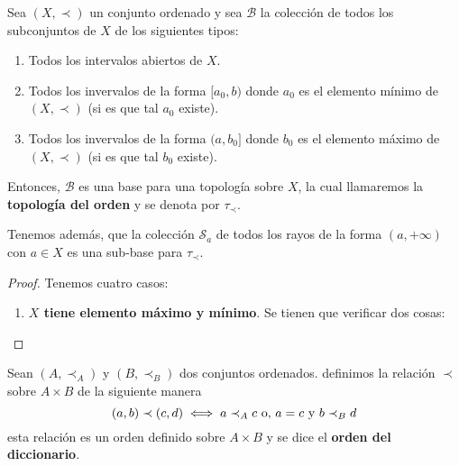 \documentclass[12pt]{report}
\theoremstyle{largebreak}
\begin{document}
    \begin{propo}
        Sea $(X,\prec)$ un conjunto ordenado y sea $\mathcal{B}$ la colección de todos los subconjuntos de $X$ de los siguientes tipos:
        \begin{enumerate}
            \item Todos los intervalos abiertos de $X$.
            \item Todos los invervalos de la forma $[a_0,b)$ donde $a_0$ es el elemento mínimo de $(X,\prec)$ (si es que tal $a_0$ existe).
            \item Todos los invervalos de la forma $(a,b_0]$ donde $b_0$ es el elemento máximo de $(X,\prec)$ (si es que tal $b_0$ existe).
        \end{enumerate}
        Entonces, $\mathcal{B}$ es una base para una topología sobre $X$, la cual llamaremos la \textbf{topología del orden} y se denota por $\tau_\prec$.

        Tenemos además, que la colección $\mathcal{S}_a$ de todos los rayos de la forma $(a,+\infty)$ con $a\in X$ es una sub-base para $\tau_\prec$.
    \end{propo}
    
    \begin{proof}
        Tenemos cuatro casos:
        \begin{enumerate}
            \item \textbf{$X$ tiene elemento máximo y mínimo}. Se tienen que verificar dos cosas:
        \end{enumerate}
    \end{proof}

    \begin{mydef}
        Sean $(A,\prec_A)$ y $(B,\prec_B)$ dos conjuntos ordenados. definimos la relación $\prec$ sobre $A\times B$ de la siguiente manera
        \begin{equation*}
            (a,b)\prec(c,d)\iff a\prec_A c\textup{ o, }a = c \textup{ y }b\prec_B d
        \end{equation*}
        esta relación es un orden definido sobre $A\times B$ y se dice el \textbf{orden del diccionario}.
    \end{mydef}
\end{document}
